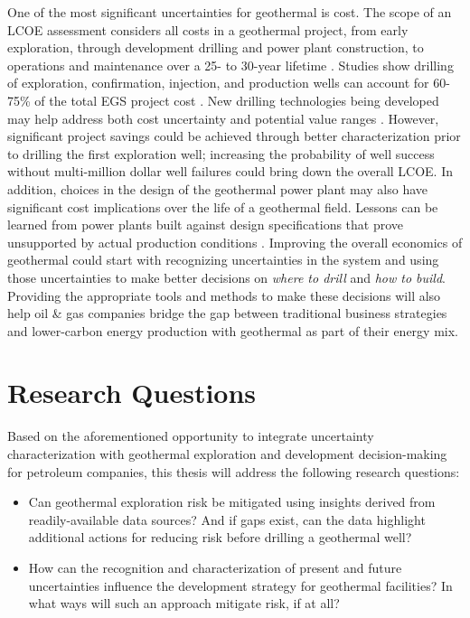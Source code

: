 One of the most significant uncertainties for geothermal is cost. The scope of an LCOE assessment considers all costs in a geothermal project, from early exploration, through development drilling and power plant construction, to operations and maintenance over a 25- to 30-year lifetime \citep{beckers_introducing_2013, entingh_volume_2006, tester_economic_1990}. Studies show drilling of exploration, confirmation, injection, and production wells can account for 60-75\% of the total EGS project cost \citep{lukawski_uncertainty_2016, petty_synergies_2009}. New drilling technologies being developed may help address both cost uncertainty and potential value ranges \citep{nrel_2020_2020}. However, significant project savings could be achieved through better characterization prior to drilling the first exploration well; increasing the probability of well success without multi-million dollar well failures could bring down the overall LCOE. In addition, choices in the design of the geothermal power plant may also have significant cost implications over the life of a geothermal field. Lessons can be learned from power plants built against design specifications that prove unsupported by actual production conditions \citep{manente_hybrid_2011}. Improving the overall economics of geothermal could start with recognizing uncertainties in the system and using those uncertainties to make better decisions on \textit{where to drill} and \textit{how to build}. Providing the appropriate tools and methods to make these decisions will also help oil \& gas companies bridge the gap between traditional business strategies and lower-carbon energy production with geothermal as part of their energy mix.

\section{Research Questions}\label{ch1:researchqs}
Based on the aforementioned opportunity to integrate uncertainty characterization with geothermal exploration and development decision-making for petroleum companies, this thesis will address the following research questions:

\begin{itemize}
  \item Can geothermal exploration risk be mitigated using insights derived from readily-available data sources? And if gaps exist, can the data highlight additional actions for reducing risk before drilling a geothermal well?
  \item How can the recognition and characterization of present and future uncertainties influence the development strategy for geothermal facilities? In what ways will such an approach mitigate risk, if at all?
\end{itemize}

